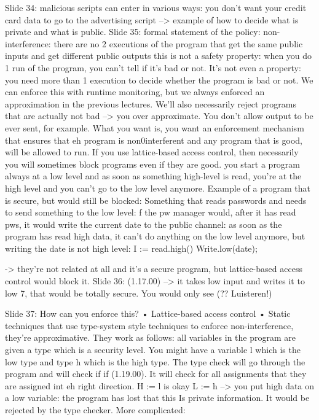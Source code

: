\documentclass[10pt,a4paper]{report}
\begin{document}
Slide 34: malicious scripts can enter in various ways: you don't want your credit card data to go to the advertising script --> example of how to decide what is private and what is public. 
Slide 35: formal statement of the policy: non-interference: there are no 2 executions of the program that get the same public inputs and get different public outputs this is not a safety property: when you do 1 run of the program, you can't tell if it's bad or not. It's not even a property: you need more than 1 execution to decide whether the program is bad or not. We can enforce this with runtime monitoring, but we always enforced an approximation in the previous lectures. We'll also necessarily reject programs that are actually not bad --> you over approximate. You don't allow output to be ever sent, for example. What you want is, you want an enforcement mechanism that ensures that eh program is non0interferent and any program that is good, will be allowed to run.
If you use lattice-based access control, then necessarily you will sometimes block programs even if they are good.  you start a program always at a low level and as soon as something high-level is read, you're at the high level and you can't go to the low level anymore.
Example of a program that is secure, but would still be blocked: 
Something that reads passwords and needs to send something to the low level: f the pw manager would, after it has read pws, it would write the current date to the public channel: as soon as the program has read high data, it can't do anything on the low level anymore, but writing the date is not high level:
I := read.high()
Write.low(date);

-> they're not related at all and it's a secure program, but lattice-based access control would block it.
Slide 36: (1.17.00) --> it takes low input and writes it to low 7, that would be totally secure.
You would only see (?? Luisteren!)

Slide 37: How can you enforce this? 
	• Lattice-based access control
	• Static techniques that use type-system style techniques to enforce non-interference, they're approximative. They work as follows: all variables in the program are given a type which is a security level. You might have a variable l which is the low type and type h which is the high type. The type check will go through the program and will check if if (1.19.00).
	It will check for all assignments that they are assigned int eh right direction. 
	H := l is okay
	L := h --> you put high data on a low variable: the program has lost that this Is private information. It would be rejected by the type checker.
	More complicated:
	
\end{document}
